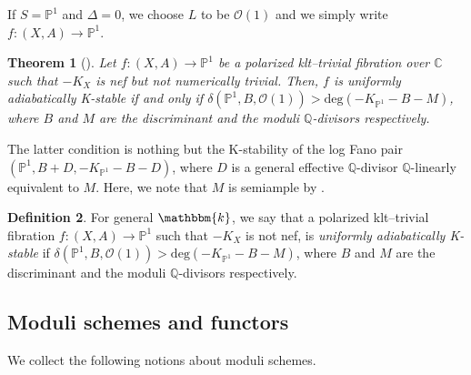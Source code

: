 \documentclass[12pt,twoside]{amsart}
\newtheorem{thm}{Theorem}[section]
\theoremstyle{definition}
\newtheorem{defn}[thm]{Definition}
\begin{document}
If $S=\mathbb{P}^1$ and $\Delta=0$, we choose $L$ to be $\mathcal{O}(1)$ and we simply write $f\colon (X,A)\to \mathbb{P}^1$. 

\begin{thm}[{\cite[Theorem 1.1]{Hat}}]
    Let $f\colon (X,A)\to \mathbb{P}^1$ be a polarized klt--trivial fibration over $\mathbb{C}$ such that $-K_X$ is nef but not numerically trivial.
    Then, $f$ is uniformly adiabatically K-stable if and only if $\delta(\mathbb{P}^1,B,\mathcal{O}(1))>\mathrm{deg}(-K_{\mathbb{P}^1}-B-M)$, where $B$ and $M$ are the discriminant and the moduli $\mathbb{Q}$-divisors respectively.
\end{thm}

The latter condition is nothing but the K-stability of the log Fano pair $(\mathbb{P}^1,B+D,-K_{\mathbb{P}^1}-B-D)$, where $D$ is a general effective $\mathbb{Q}$-divisor $\mathbb{Q}$-linearly equivalent to $M$.
Here, we note that $M$ is semiample by \cite[Theorem 0.1]{A}.

\begin{defn}\label{defn--unif--ad--Kst2}
For general $\mathbbm{k}$, we say that a polarized klt--trivial fibration $f\colon (X,A)\to\mathbb{P}^1$ such that $-K_X$ is not nef, is {\it uniformly adiabatically K-stable} if $\delta(\mathbb{P}^1,B,\mathcal{O}(1))>\mathrm{deg}(-K_{\mathbb{P}^1}-B-M)$, where $B$ and $M$ are the discriminant and the moduli $\mathbb{Q}$-divisors respectively.   
\end{defn}

\subsection{Moduli schemes and functors}\label{Subsection--Hilb}

We collect the following notions about moduli schemes.
\end{document}
